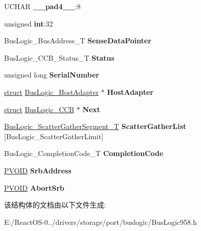 \begin{DoxyCompactItemize}
U\+C\+H\+AR {\bfseries \+\_\+\+\_\+pad4\+\_\+\+\_\+}\+:8
\item 
\mbox{\label{struct_bus_logic___c_c_b_af78d3a83e511be70c9e050a1442550b8}} 
unsigned {\bfseries int}\+:32
\item 
\mbox{\label{struct_bus_logic___c_c_b_afc939acd4600e1a1b06a67996818a7ba}} 
Bus\+Logic\+\_\+\+Bus\+Address\+\_\+T {\bfseries Sense\+Data\+Pointer}
\item 
\mbox{\label{struct_bus_logic___c_c_b_a40137959bf2501b492e536aea97c973a}} 
Bus\+Logic\+\_\+\+C\+C\+B\+\_\+\+Status\+\_\+T {\bfseries Status}
\item 
\mbox{\label{struct_bus_logic___c_c_b_a3b7b2ec02151cca644f4c57dceef2cd8}} 
unsigned long {\bfseries Serial\+Number}
\item 
\mbox{\label{struct_bus_logic___c_c_b_ac1dd38471bcb30b6aca1ce038ef65e76}} 
\hyperlink{interfacestruct}{struct} \hyperlink{struct_bus_logic___host_adapter}{Bus\+Logic\+\_\+\+Host\+Adapter} $\ast$ {\bfseries Host\+Adapter}
\item 
\mbox{\label{struct_bus_logic___c_c_b_aed433b9bc7274bf17721c0d841b23d2b}} 
\hyperlink{interfacestruct}{struct} \hyperlink{struct_bus_logic___c_c_b}{Bus\+Logic\+\_\+\+C\+CB} $\ast$ {\bfseries Next}
\item 
\mbox{\label{struct_bus_logic___c_c_b_ae4ea737c7735a113b9e7e2efa587cb4d}} 
\hyperlink{struct_bus_logic___scatter_gather_segment}{Bus\+Logic\+\_\+\+Scatter\+Gather\+Segment\+\_\+T} {\bfseries Scatter\+Gather\+List} \mbox{[}Bus\+Logic\+\_\+\+Scatter\+Gather\+Limit\mbox{]}
\item 
\mbox{\label{struct_bus_logic___c_c_b_a23dc0548771808b12f4484452355e946}} 
Bus\+Logic\+\_\+\+Completion\+Code\+\_\+T {\bfseries Completion\+Code}
\item 
\mbox{\label{struct_bus_logic___c_c_b_a75d49af8e7e3d0a797fd56049a7c1daa}} 
\hyperlink{interfacevoid}{P\+V\+O\+ID} {\bfseries Srb\+Address}
\item 
\mbox{\label{struct_bus_logic___c_c_b_a8e3ded182ee18b7c386426b4e0d14b8c}} 
\hyperlink{interfacevoid}{P\+V\+O\+ID} {\bfseries Abort\+Srb}
\end{DoxyCompactItemize}


该结构体的文档由以下文件生成\+:\begin{DoxyCompactItemize}
\item 
E\+:/\+React\+O\+S-\/0../drivers/storage/port/buslogic/Bus\+Logic958.\+h\end{DoxyCompactItemize}
